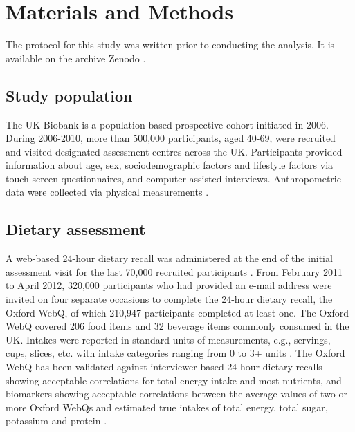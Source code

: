 \documentclass[nutrients,article,submit,moreauthors,pdftex]{Definitions/mdpi}
\begin{document}
\hypertarget{sec2}{%
\section{Materials and Methods}\label{sec2}}

\noindent The protocol for this study was written prior to conducting
the analysis. It is available on the archive Zenodo \citep{protocol}.

\hypertarget{subsec1}{%
\subsection{Study population}\label{subsec1}}

The UK Biobank is a population-based prospective cohort initiated in
2006. \citep{sudlow2015} During 2006-2010, more than 500,000 participants,
aged 40-69, were recruited and visited designated assessment centres
across the UK. Participants provided information about age, sex,
sociodemographic factors and lifestyle factors via touch screen
questionnaires, and computer-assisted interviews. Anthropometric data
were collected via physical measurements \citep{RN113}.

\hypertarget{subsec2}{%
\subsection{Dietary assessment}\label{subsec2}}

A web-based 24-hour dietary recall was administered at the end of the
initial assessment visit for the last 70,000 recruited participants
\citep{RN115}. From February 2011 to April 2012, 320,000 participants who had
provided an e-mail address were invited on four separate occasions to
complete the 24-hour dietary recall, the Oxford WebQ, of which 210,947
participants completed at least one. The Oxford WebQ covered 206 food
items and 32 beverage items commonly consumed in the UK. Intakes were
reported in standard units of measurements, e.g., servings, cups,
slices, etc. with intake categories ranging from 0 to 3+ units
\citep{piernas2021}. The Oxford WebQ has been validated against
interviewer-based 24-hour dietary recalls showing acceptable
correlations for total energy intake and most nutrients, and biomarkers
showing acceptable correlations between the average values of two or
more Oxford WebQs and estimated true intakes of total energy, total
sugar, potassium and protein \citep{Liu2011, Greenwood2019}.
\end{document}
